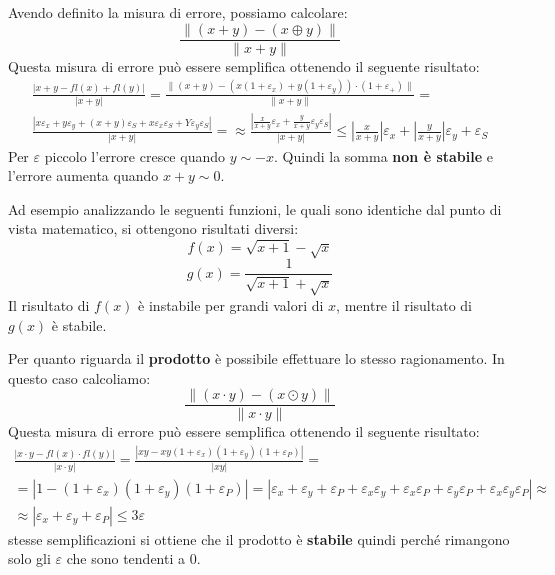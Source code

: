 Avendo definito la misura di errore, possiamo calcolare:
\begin{equation}
    \frac{\|(x+y)-(x\oplus y)\|}{\|x+y\|}
\end{equation}
Questa misura di errore può essere semplifica ottenendo il seguente risultato:
\begin{equation}
    \begin{aligned}
        \frac{|x + y - fl(x) + fl(y)|}{|x + y|} = \frac{\|(x + y) - (x (1 +
        \varepsilon_x) + y(1 + \varepsilon_y)) \cdot (1 + \varepsilon_+)\|}{\|x + y\|} = \\
        \frac{|x \varepsilon_x + y \varepsilon_y + (x + y) \varepsilon_S + x
            \varepsilon_x \varepsilon_S + Y \varepsilon_y \varepsilon_S|}{|x + y|} =
        \approx \frac{\left|\frac{x}{x + y} \varepsilon_x + \frac{y}{x + y}
            \varepsilon_y \varepsilon_S \right|}{|x + y|} \leq \left|\frac{x}{x + y}
        \right| \varepsilon_x + \left|\frac{y}{x + y}\right| \varepsilon_y + \varepsilon_S
    \end{aligned}
\end{equation}
Per $\varepsilon$ piccolo l'errore cresce quando $y \sim -x$. Quindi la somma
\textbf{non è stabile} e l'errore aumenta quando $x + y \sim 0$.
\begin{esempio}
    Ad esempio analizzando le seguenti funzioni, le quali sono identiche dal
    punto di vista matematico, si ottengono risultati diversi:
    \begin{equation*}
        f(x) = \sqrt{x + 1} - \sqrt{x}
    \end{equation*}
    \begin{equation*}
        g(x) = \frac{1}{\sqrt{x + 1} + \sqrt{x}}
    \end{equation*}
    Il risultato di $f(x)$ è instabile per grandi valori di $x$, mentre il
    risultato di $g(x)$ è stabile.
\end{esempio}
Per quanto riguarda il \textbf{prodotto} è possibile effettuare lo stesso
ragionamento. In questo caso calcoliamo:
\begin{equation}
    \frac{\|(x\cdot y)-(x\odot y)\|}{\|x\cdot y\|}
\end{equation}
Questa misura di errore può essere semplifica ottenendo il seguente risultato:
\begin{equation}
    \begin{aligned}
        \frac{|x \cdot y - fl(x) \cdot fl(y)|}{|x \cdot y|} = \frac{|xy - xy(1 +
        \varepsilon_x)(1 + \varepsilon_y)(1 + \varepsilon_P)|}{|xy|} = \\
        = |1 - (1 + \varepsilon_x)(1 + \varepsilon_y)(1 + \varepsilon_P)| =
        |\varepsilon_x + \varepsilon_y + \varepsilon_P + \varepsilon_x \varepsilon_y
        + \varepsilon_x \varepsilon_P + \varepsilon_y \varepsilon_P + \varepsilon_x
        \varepsilon_y \varepsilon_P| \approx                           \\
        \approx |\varepsilon_x + \varepsilon_y + \varepsilon_P| \leq 3\varepsilon
    \end{aligned}
\end{equation}
stesse semplificazioni si ottiene che il prodotto è \textbf{stabile} quindi perché
rimangono solo gli $\varepsilon$ che sono tendenti a $0$.